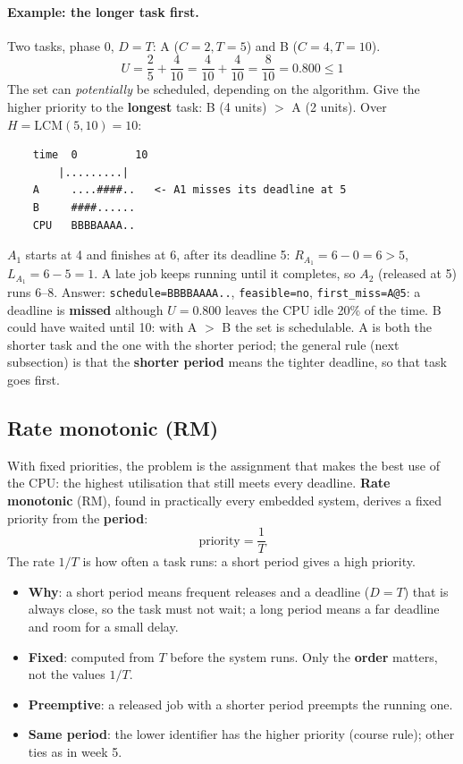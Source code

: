 \paragraph{Example: the longer task first.} Two tasks, phase 0, $D = T$: A ($C = 2, T = 5$) and B ($C = 4, T = 10$).
\[
U = \frac{2}{5} + \frac{4}{10} = \frac{4}{10} + \frac{4}{10} = \frac{8}{10} = 0.800 \le 1
\]
The set can \emph{potentially} be scheduled, depending on the algorithm. Give the higher priority to the \textbf{longest} task: B (4 units) $>$ A (2 units). Over $H = \mathrm{LCM}(5, 10) = 10$:
\begin{verbatim}
    time  0         10
        |.........|
    A     ....####..   <- A1 misses its deadline at 5
    B     ####......
    CPU   BBBBAAAA..
\end{verbatim}
$A_1$ starts at 4 and finishes at 6, after its deadline 5: $R_{A_1} = 6 - 0 = 6 > 5$, $L_{A_1} = 6 - 5 = 1$. A late job keeps running until it completes, so $A_2$ (released at 5) runs 6--8. Answer: \texttt{schedule=BBBBAAAA..}, \texttt{feasible=no}, \texttt{first\_miss=A@5}: a deadline is \textbf{missed} although $U = 0.800$ leaves the CPU idle 20\% of the time. B could have waited until 10: with A $>$ B the set is schedulable. A is both the shorter task and the one with the shorter period; the general rule (next subsection) is that the \textbf{shorter period} means the tighter deadline, so that task goes first.

\subsection{Rate monotonic (RM)}
With fixed priorities, the problem is the assignment that makes the best use of the CPU: the highest utilisation that still meets every deadline. \textbf{Rate monotonic} (RM), found in practically every embedded system, derives a fixed priority from the \textbf{period}:
\[
\text{priority} = \frac{1}{T}
\]
The rate $1/T$ is how often a task runs: a short period gives a high priority.
\begin{itemize}
    \item \textbf{Why}: a short period means frequent releases and a deadline ($D = T$) that is always close, so the task must not wait; a long period means a far deadline and room for a small delay.
    \item \textbf{Fixed}: computed from $T$ before the system runs. Only the \textbf{order} matters, not the values $1/T$.
    \item \textbf{Preemptive}: a released job with a shorter period preempts the running one.
    \item \textbf{Same period}: the lower identifier has the higher priority (course rule); other ties as in week 5.
\end{itemize}

